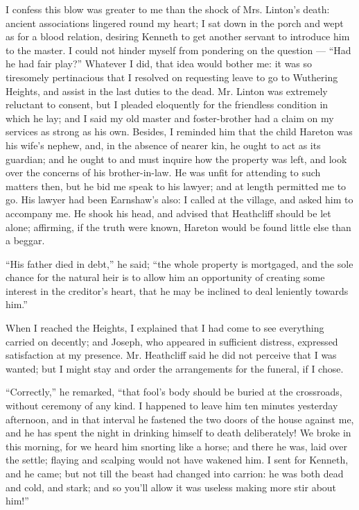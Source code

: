 \par I confess this blow was greater to me than the shock of Mrs. Linton's death: ancient associations lingered round my heart; I sat down in the porch and wept as for a blood relation, desiring Kenneth to get another servant to introduce him to the master. I could not hinder myself from pondering on the question — “Had he had fair play?” Whatever I did, that idea would bother me: it was so tiresomely pertinacious that I resolved on requesting leave to go to Wuthering Heights, and assist in the last duties to the dead. Mr. Linton was extremely reluctant to consent, but I pleaded eloquently for the friendless condition in which he lay; and I said my old master and foster-brother had a claim on my services as strong as his own. Besides, I reminded him that the child Hareton was his wife's nephew, and, in the absence of nearer kin, he ought to act as its guardian; and he ought to and must inquire how the property was left, and look over the concerns of his brother-in-law. He was unfit for attending to such matters then, but he bid me speak to his lawyer; and at length permitted me to go. His lawyer had been Earnshaw's also: I called at the village, and asked him to accompany me. He shook his head, and advised that Heathcliff should be let alone; affirming, if the truth were known, Hareton would be found little else than a beggar.
\par “His father died in debt,” he said; “the whole property is mortgaged, and the sole chance for the natural heir is to allow him an opportunity of creating some interest in the creditor's heart, that he may be inclined to deal leniently towards him.”
\par When I reached the Heights, I explained that I had come to see everything carried on decently; and Joseph, who appeared in sufficient distress, expressed satisfaction at my presence. Mr. Heathcliff said he did not perceive that I was wanted; but I might stay and order the arrangements for the funeral, if I chose.
\par “Correctly,” he remarked, “that fool's body should be buried at the crossroads, without ceremony of any kind. I happened to leave him ten minutes yesterday afternoon, and in that interval he fastened the two doors of the house against me, and he has spent the night in drinking himself to death deliberately! We broke in this morning, for we heard him snorting like a horse; and there he was, laid over the settle; flaying and scalping would not have wakened him. I sent for Kenneth, and he came; but not till the beast had changed into carrion: he was both dead and cold, and stark; and so you'll allow it was useless making more stir about him!”
